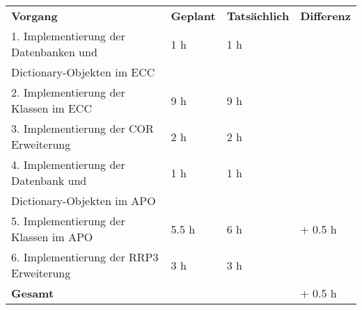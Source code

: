 \begin{tabu}{llll}
\rowfont{\bfseries\leavevmode\color{headingfont}}\textbf{Vorgang} & \textbf{Geplant} & \textbf{Tatsächlich} & \textbf{Differenz} \\
1. Implementierung der Datenbanken und & 1 h & 1 h & \\ 
Dictionary-Objekten im ECC & & & \\
2. Implementierung der Klassen im ECC & 9 h & 9 h & \\
3.  Implementierung der COR Erweiterung & 2 h & 2 h & \\
4. Implementierung der Datenbank und & 1 h & 1 h & \\ 
Dictionary-Objekten im APO & & & \\
5. Implementierung der Klassen im APO & 5.5 h & 6 h & + 0.5 h \\
6.  Implementierung der RRP3 Erweiterung & 3 h & 3 h & \\
\hline
\hline
{}\textbf{Gesamt} & & & + 0.5 h \\
\end{tabu}